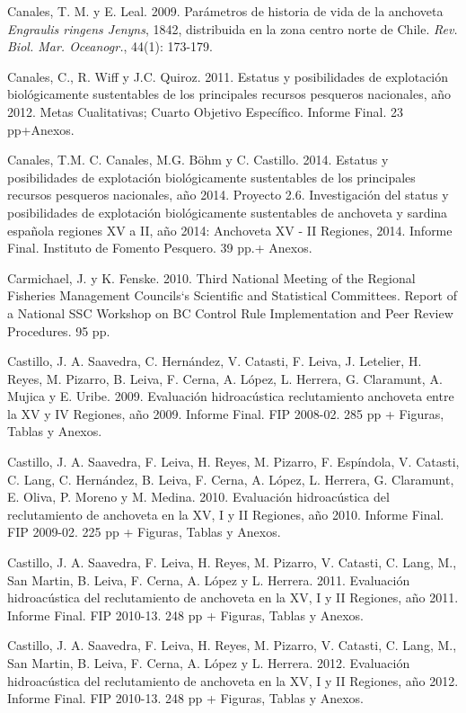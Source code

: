 \documentclass[letter,11pt]{article}
\begin{document}
Canales, T. M. y E. Leal. 2009. Par\'ametros de historia de vida de la
anchoveta \textit{Engraulis ringens Jenyns}, 1842, distribuida en la
zona centro norte de Chile. \textit{Rev. Biol. Mar. Oceanogr.}, 44(1):
173-179.

Canales, C., R. Wiff y J.C. Quiroz. 2011. Estatus y posibilidades de
explotaci\'on biol\'ogicamente sustentables de los principales recursos
pesqueros nacionales, a\~{n}o 2012. Metas Cualitativas; Cuarto Objetivo
Espec\'ifico. Informe Final. 23 pp+Anexos.

Canales, T.M. C. Canales, M.G. B\"ohm y C. Castillo. 2014. Estatus y
posibilidades de explotaci\'on biol\'ogicamente sustentables de los
principales recursos pesqueros nacionales, a\~{n}o 2014. Proyecto 2.6.
Investigaci\'on del status y posibilidades de explotaci\'on biol\'ogicamente
sustentables de anchoveta y sardina espa\~{n}ola regiones XV a II, a\~{n}o 2014:
Anchoveta XV - II Regiones, 2014. Informe Final. Instituto de Fomento
Pesquero. 39 pp.+ Anexos.

Carmichael, J. y K. Fenske. 2010. Third National Meeting of the Regional
Fisheries Management Councils`s Scientific and Statistical Committees.
Report of a National SSC Workshop on BC Control Rule Implementation and
Peer Review Procedures. 95 pp.

Castillo, J. A. Saavedra, C. Hern\'andez, V. Catasti, F. Leiva, J.
Letelier, H. Reyes, M. Pizarro, B. Leiva, F. Cerna, A. L\'opez, L.
Herrera, G. Claramunt, A. Mujica y E. Uribe. 2009. Evaluaci\'on
hidroac\'ustica reclutamiento anchoveta entre la XV y IV Regiones, a\~{n}o
2009. Informe Final. FIP 2008-02. 285 pp + Figuras, Tablas y Anexos.

Castillo, J. A. Saavedra, F. Leiva, H. Reyes, M. Pizarro, F. Esp\'indola,
V. Catasti, C. Lang, C. Hern\'andez, B. Leiva, F. Cerna, A. L\'opez, L.
Herrera, G. Claramunt, E. Oliva, P. Moreno y M. Medina. 2010. Evaluaci\'on
hidroac\'ustica del reclutamiento de anchoveta en la XV, I y II Regiones,
a\~{n}o 2010. Informe Final. FIP 2009-02. 225 pp + Figuras, Tablas y Anexos.

Castillo, J. A. Saavedra, F. Leiva, H. Reyes, M. Pizarro, V. Catasti, C.
Lang, M., San Martin, B. Leiva, F. Cerna, A. L\'opez y L. Herrera. 2011.
Evaluaci\'on hidroac\'ustica del reclutamiento de anchoveta en la XV, I y II
Regiones, a\~{n}o 2011. Informe Final. FIP 2010-13. 248 pp + Figuras, Tablas
y Anexos.

Castillo, J. A. Saavedra, F. Leiva, H. Reyes, M. Pizarro, V. Catasti, C.
Lang, M., San Martin, B. Leiva, F. Cerna, A. L\'opez y L. Herrera. 2012.
Evaluaci\'on hidroac\'ustica del reclutamiento de anchoveta en la XV, I y II
Regiones, a\~{n}o 2012. Informe Final. FIP 2010-13. 248 pp + Figuras, Tablas
y Anexos.
\end{document}
